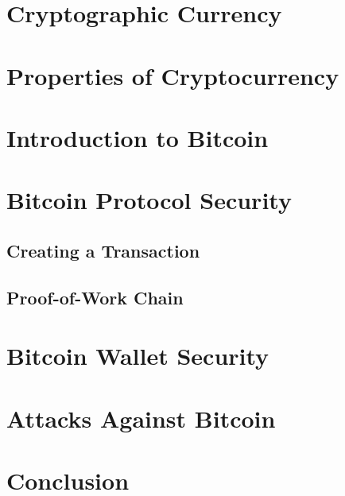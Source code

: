 \documentclass{report}
\begin{document}
\section*{Cryptographic Currency}

\section*{Properties of Cryptocurrency}

\section*{Introduction to Bitcoin}

\section*{Bitcoin Protocol Security}
\subsection*{Creating a Transaction}
\subsection*{Proof-of-Work Chain}

\section*{Bitcoin Wallet Security}

\section*{Attacks Against Bitcoin}

\section*{Conclusion}
\end{document}
